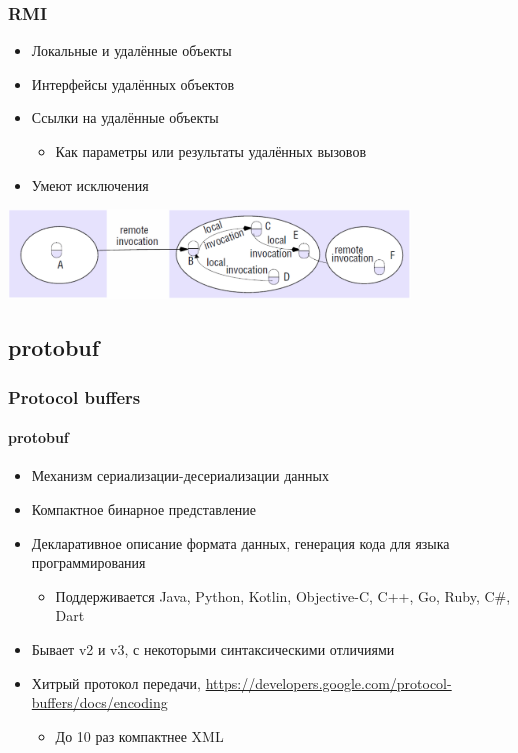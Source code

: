 \documentclass{../../slides-style}
\begin{document}
    \begin{frame}
        \frametitle{RMI}
        \begin{itemize}
            \item Локальные и удалённые объекты
            \item Интерфейсы удалённых объектов
            \item Ссылки на удалённые объекты
            \begin{itemize}
                \item Как параметры или результаты удалённых вызовов
            \end{itemize}
            \item Умеют исключения
        \end{itemize}
        \begin{center}
            \includegraphics[width=0.8\textwidth]{remoteCalls.png}
        \end{center}
    \end{frame}

    \subsection{protobuf}

    \begin{frame}
        \frametitle{Protocol buffers}
        \framesubtitle{protobuf}
        \begin{itemize}
            \item Механизм сериализации-десериализации данных
            \item Компактное бинарное представление
            \item Декларативное описание формата данных, генерация кода для языка программирования
            \begin{itemize}
                \item Поддерживается Java, Python, Kotlin, Objective-C, C++, Go, Ruby, C\#, Dart
            \end{itemize}
            \item Бывает v2 и v3, с некоторыми синтаксическими отличиями
            \item Хитрый протокол передачи, \url{https://developers.google.com/protocol-buffers/docs/encoding}
            \begin{itemize}
                \item До 10 раз компактнее XML 
            \end{itemize}
        \end{itemize}
    \end{frame}
\end{document}
